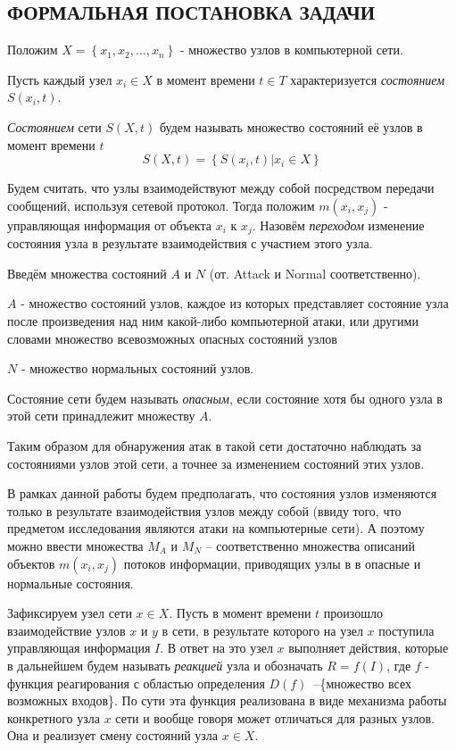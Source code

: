 \subsection{ФОРМАЛЬНАЯ ПОСТАНОВКА ЗАДАЧИ}


Положим $X = \left\{x_1, x_2, ..., x_n\right\} $ - множество узлов в компьютерной сети.

Пусть каждый узел $x_i \in X$ в момент времени $t \in T$ характеризуется \textit{состоянием} $S(x_i, t)$.

\textit{Состоянием} сети $S(X, t)$ будем называть множество состояний её узлов в момент времени $t$
\begin{equation*}
S(X, t) = \left\{S(x_i, t) | x_i \in X\right\}
\end{equation*}


Будем считать, что узлы взаимодействуют между собой посредством передачи сообщений, используя сетевой протокол. Тогда положим $m(x_i, x_j)$ - управляющая информация от объекта $x_i$ к $x_j$. Назовём \textit{переходом} изменение состояния узла в результате взаимодействия с участием этого узла. 

Введём множества состояний $A$ и $N$ (от. Attack и Normal соответственно).

$A$ - множество состояний узлов, каждое из которых представляет состояние узла после произведения над ним какой-либо компьютерной атаки, или другими словами множество всевозможных опасных состояний узлов

$N$ - множество нормальных состояний узлов.

Состояние сети будем называть \textit{опасным}, если состояние хотя бы одного узла в этой сети принадлежит множеству $A$.

Таким образом для обнаружения атак в такой сети достаточно наблюдать за состояниями узлов этой сети, а точнее за изменением состояний этих узлов. 

В рамках данной работы будем предполагать, что состояния узлов изменяются только в результате взаимодействия узлов между собой (ввиду того, что предметом исследования являются атаки на компьютерные сети). А поэтому можно ввести множества $M_A$ и $M_N$ -- соответственно множества описаний объектов $m(x_i, x_j)$ потоков информации, приводящих узлы в в опасные и нормальные состояния.


Зафиксируем узел сети $x \in X$. 
Пусть в момент времени $t$ произошло взаимодействие узлов $x$ и $y$ в сети, в результате которого на узел $x$ поступила управляющая информация $I$. В ответ на это узел $x$ выполняет действия, которые в дальнейшем будем называть \textit{реакцией} узла и обозначать $R = f(I)$, где $f$ - функция реагирования с областью определения $D(f)$~--\{множество всех возможных входов\}. По сути эта функция реализована в виде механизма работы конкретного узла $x$ сети и вообще говоря может отличаться для разных узлов. Она и реализует смену состояний узла $x \in X$.

